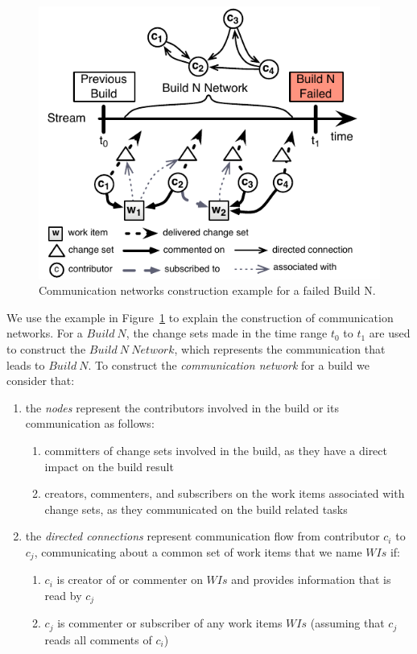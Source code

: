 \begin{figure}[t]
\begin{center}
\includegraphics[width=\columnwidth]{figures/BuildResultNetworks3}
\caption{Communication networks construction example for a failed Build N.}
\label{fig:NetworkConstructionExample}
\end{center}
\end{figure}

We use the example in Figure~\ref{fig:NetworkConstructionExample} to explain the
construction of communication networks. For a $Build~N$, the change sets made in
the time range $t_0$ to $t_1$ are used to construct the $Build~N~Network$, which
represents the communication that leads to $Build~N$. To construct the
\emph{communication network} for a build we consider that:

\begin{enumerate}
  \item the \emph{nodes} represent the contributors involved in the build or 
 its communication as follows:
  \begin{enumerate}
    \item committers of change sets involved in the build, as they have a
    direct impact on the build result
    \item creators, commenters, and subscribers on the work items associated with
    change sets, as they communicated on the build related tasks
  \end{enumerate}
  \item the \emph{directed connections} represent communication flow
  from contributor $c_i$ to $c_j$, communicating about a common set of
  work items that we name $WIs$ if:
  \begin{enumerate}
    \item $c_i$ is creator of or commenter on $WIs$ and provides
    information that is read by $c_j$
    \item $c_j$ is commenter or subscriber of any work items $WIs$ (assuming
    that $c_j$ reads all comments of $c_i$)
  \end{enumerate}
\end{enumerate}


